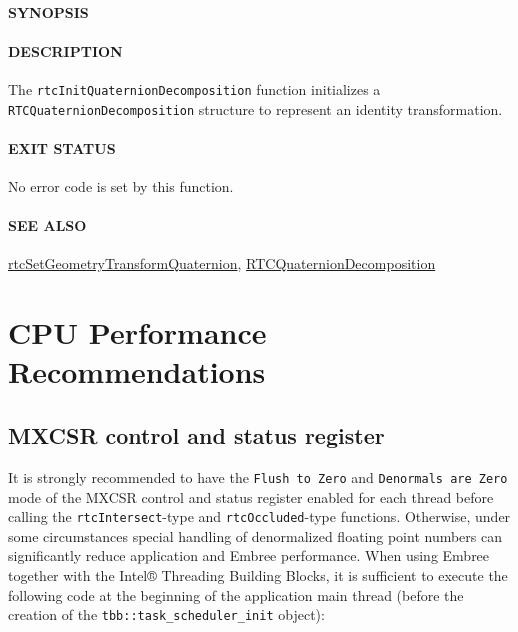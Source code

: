 \subsubsection{SYNOPSIS}\label{synopsis}

\begin{Shaded}
\begin{Highlighting}[]
\OperatorTok{(}
  \OperatorTok{*}
\OperatorTok{);}
\end{Highlighting}
\end{Shaded}

\subsubsection{DESCRIPTION}\label{description}

The \texttt{rtcInitQuaternionDecomposition} function initializes a
\texttt{RTCQuaternionDecomposition} structure to represent an identity
transformation.

\subsubsection{EXIT STATUS}\label{exit-status}

No error code is set by this function.

\subsubsection{SEE ALSO}\label{see-also}

\hyperref[rtcsetgeometrytransformquaternion]{rtcSetGeometryTransformQuaternion},
\hyperref[rtcquaterniondecomposition]{RTCQuaternionDecomposition}

\pagebreak

\chapter{CPU Performance
Recommendations}\label{cpu-performance-recommendations}

\section{MXCSR control and status
register}\label{mxcsr-control-and-status-register}

It is strongly recommended to have the \texttt{Flush\ to\ Zero} and
\texttt{Denormals\ are\ Zero} mode of the MXCSR control and status
register enabled for each thread before calling the
\texttt{rtcIntersect}-type and \texttt{rtcOccluded}-type functions.
Otherwise, under some circumstances special handling of denormalized
floating point numbers can significantly reduce application and Embree
performance. When using Embree together with the Intel® Threading
Building Blocks, it is sufficient to execute the following code at the
beginning of the application main thread (before the creation of the
\texttt{tbb::task\_scheduler\_init} object):


